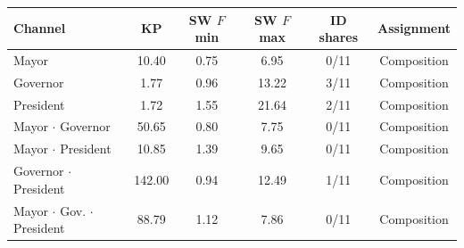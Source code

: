 \begin{tabular}{@{}lccccc@{}}
\toprule
Channel & KP & SW $F$ min & SW $F$ max & ID shares & Assignment \\
\midrule
Mayor & 10.40 & 0.75 & 6.95 & 0/11 & Composition \\
Governor & 1.77 & 0.96 & 13.22 & 3/11 & Composition \\
President & 1.72 & 1.55 & 21.64 & 2/11 & Composition \\
Mayor $\cdot$ Governor & 50.65 & 0.80 & 7.75 & 0/11 & Composition \\
Mayor $\cdot$ President & 10.85 & 1.39 & 9.65 & 0/11 & Composition \\
Governor $\cdot$ President & 142.00 & 0.94 & 12.49 & 1/11 & Composition \\
Mayor $\cdot$ Gov. $\cdot$ President & 88.79 & 1.12 & 7.86 & 0/11 & Composition \\
\bottomrule
\end{tabular}
